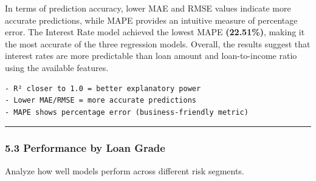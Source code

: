 \documentclass[11pt]{article}
\begin{document}
In terms of prediction accuracy, lower MAE and RMSE values indicate more
accurate predictions, while MAPE provides an intuitive measure of
percentage error. The Interest Rate model achieved the lowest MAPE
\textbf{(22.51\%)}, making it the most accurate of the three regression
models. Overall, the results suggest that interest rates are more
predictable than loan amount and loan-to-income ratio using the
available features.

\begin{verbatim}
- R² closer to 1.0 = better explanatory power
- Lower MAE/RMSE = more accurate predictions
- MAPE shows percentage error (business-friendly metric)
\end{verbatim}

    \begin{center}\rule{0.5\linewidth}{0.5pt}\end{center}

\subsubsection{5.3 Performance by Loan
Grade}\label{performance-by-loan-grade}

Analyze how well models perform across different risk segments.
\end{document}
